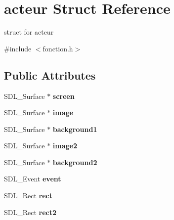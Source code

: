 \hypertarget{structacteur}{}\section{acteur Struct Reference}
\label{structacteur}


struct for acteur  




{\ttfamily \#include $<$fonction.\+h$>$}

\subsection*{Public Attributes}
\begin{DoxyCompactItemize}
\item 
\mbox{\label{structacteur_a07a96e94e6c43095e9fab0d1f077e3ac}} 
S\+D\+L\+\_\+\+Surface $\ast$ {\bfseries screen}
\item 
\mbox{\label{structacteur_ad45d4021795636e16e5785fbfa152530}} 
S\+D\+L\+\_\+\+Surface $\ast$ {\bfseries image}
\item 
\mbox{\label{structacteur_a631b8442e4264750afc914b800105b0a}} 
S\+D\+L\+\_\+\+Surface $\ast$ {\bfseries background1}
\item 
\mbox{\label{structacteur_ac0054a0e942511dc6b7f1a36d12e5813}} 
S\+D\+L\+\_\+\+Surface $\ast$ {\bfseries image2}
\item 
\mbox{\label{structacteur_a9ad6e759e8c6207dfc6f52ad0308a406}} 
S\+D\+L\+\_\+\+Surface $\ast$ {\bfseries background2}
\item 
\mbox{\label{structacteur_a5cbc6efc9f05581578b5adc9bcc3c15c}} 
S\+D\+L\+\_\+\+Event {\bfseries event}
\item 
\mbox{\label{structacteur_a6c0d04ec13207c162908f6337da3811a}} 
S\+D\+L\+\_\+\+Rect {\bfseries rect}
\item 
\mbox{\label{structacteur_a2482ac60203e9183250f1288f8d2d6de}} 
S\+D\+L\+\_\+\+Rect {\bfseries rect2}
\item 
\mbox{\label{structacteur_a8143c336841efa3650723cbfa8e9e072}} 

\end{DoxyCompactItemize}
